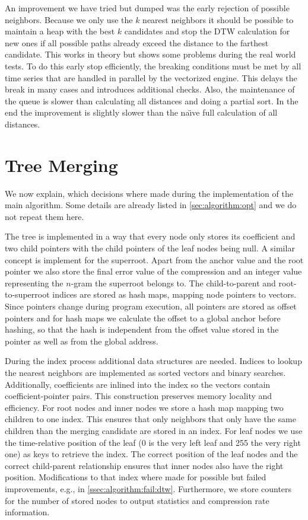 An improvement we have tried but dumped was the early rejection of possible neighbors. Because we only use the $k$ nearest neighbors it should be possible to maintain a heap with the best $k$ candidates and stop the DTW calculation for new ones if all possible paths already exceed the distance to the farthest candidate. This works in theory but shows some problems during the real world tests. To do this early stop efficiently, the breaking conditions must be met by all time series that are handled in parallel by the vectorized engine. This delays the break in many cases and introduces additional checks. Also, the maintenance of the queue is slower than calculating all distances and doing a partial sort. In the end the improvement is slightly slower than the na{\"\i}ve full calculation of all distances.



\section{Tree Merging}
\label{sec:implementation:tree}

We now explain, which decisions where made during the implementation of the main algorithm. Some details are already listed in \autoref{sec:algorithm:opt} and we do not repeat them here.

The tree is implemented in a way that every node only stores its coefficient and two child pointers with the child pointers of the leaf nodes being null. A similar concept is implement for the superroot. Apart from the anchor value and the root pointer we also store the final error value of the compression and an integer value representing the $n$-gram the superroot belongs to. The child-to-parent and root-to-superroot indices are stored as hash maps, mapping node pointers to vectors. Since pointers change during program execution, all pointers are stored as offset pointers and for hash maps we calculate the offset to a global anchor before hashing, so that the hash is independent from the offset value stored in the pointer as well as from the global address.

During the index process additional data structures are needed. Indices to lookup the nearest neighbors are implemented as sorted vectors and binary searches. Additionally, coefficients are inlined into the index so the vectors contain coefficient-pointer pairs. This construction preserves memory locality and efficiency. For root nodes and inner nodes we store a hash map mapping two children to one index. This ensures that only neighbors that only have the same children than the merging candidate are stored in an index. For leaf nodes we use the time-relative position of the leaf (\num{0} is the very left leaf and \num{255} the very right one) as keys to retrieve the index. The correct position of the leaf nodes and the correct child-parent relationship ensures that inner nodes also have the right position. Modifications to that index where made for possible but failed improvements, e.g., in \autoref{ssec:algorithm:fail:dtw}. Furthermore, we store counters for the number of stored nodes to output statistics and compression rate information.

